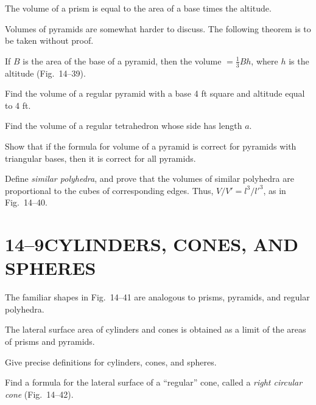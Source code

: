 \documentclass[11pt]{book}
\begin{document}
\begin{theorem}
The volume of a prism is equal to the area of a base times the altitude.
\end{theorem}

Volumes of pyramids are somewhat harder to discuss. The following theorem is to
be taken without proof.

\begin{theorem}
If $B$ is the area of the base of a pyramid, then the volume $=
\frac{1}{3}Bh$, where $h$ is the altitude (Fig.~14--39).
\end{theorem}

\FIGXIVTHIRTYNINE

\begin{exercisecols}
\begin{exlist}
\item Find the volume of a regular pyramid with a base 4 ft square and altitude
      equal to 4 ft.
\item Find the volume of a regular tetrahedron whose side has length $a$.
\item Show that if the formula for volume of a pyramid is correct for pyramids
      with triangular bases, then it is correct for all pyramids.
\item Define \emph{similar polyhedra}, and prove that the volumes of similar
      polyhedra are proportional to the cubes of corresponding edges. Thus,
      $V/V' = l^3/l'^3$, as in Fig.~14--40.
\exfig{\FIGXIVFORTY}
\end{exlist}
\end{exercisecols}

\section*{14--9\quad CYLINDERS, CONES, AND SPHERES}

The familiar shapes in Fig.~14--41 are analogous to prisms, pyramids, and
regular polyhedra.

The lateral surface area of cylinders and cones is obtained as a limit of the
areas of prisms and pyramids.

\FIGXIVFORTYONE

\begin{exercisecols}
\begin{exlist}
\item Give precise definitions for cylinders, cones, and spheres.
\item Find a formula for the lateral surface of a ``regular'' cone, called a
      \emph{right circular cone} (Fig.~14--42).
\exfig{\FIGXIVFORTYTWO}
\end{exlist}
\end{exercisecols}
\end{document}
